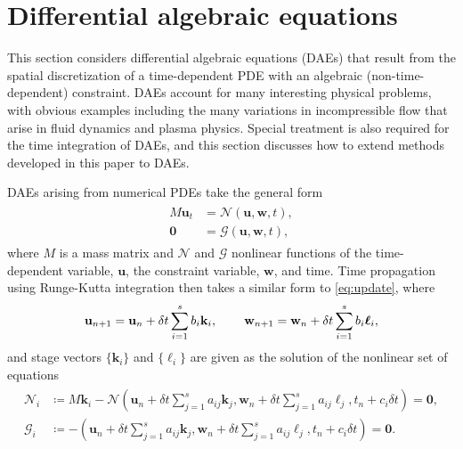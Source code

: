\documentclass[review]{siamart}
\begin{document}
\section{Differential algebraic equations}\label{sec:dae}

This section considers differential algebraic equations (DAEs) that result from
the spatial discretization of a time-dependent PDE with an algebraic
(non-time-dependent) constraint. DAEs account for many interesting physical
problems, with obvious examples including the many variations in incompressible
flow that arise in fluid dynamics and plasma physics. Special treatment is also
required for the time integration of DAEs, and this section discusses how to
extend methods developed in this paper to DAEs.

DAEs arising from numerical PDEs take the general form
%
\begin{align}\label{eq:dae}
\begin{split}
M\mathbf{u}_t & = \mathcal{N}(\mathbf{u},\mathbf{w},t), \\
\mathbf{0} & = \mathcal{G}(\mathbf{u},\mathbf{w},t),
\end{split}
\end{align}
%
where $M$ is a mass matrix and $\mathcal{N}$ and $\mathcal{G}$ nonlinear
functions of the time-dependent variable, $\mathbf{u}$, the constraint
variable, $\mathbf{w}$, and time.
Time propagation using Runge-Kutta integration then takes a similar form to
\eqref{eq:update}, where
%
\begin{align*}
\mathbf{u}_{n+1} = \mathbf{u}_n + \delta t\sum_{i=1}^s b_i\mathbf{k}_i, \hspace{5ex}
\mathbf{w}_{n+1} = \mathbf{w}_n + \delta t\sum_{i=1}^s b_i\boldsymbol{\ell}_i,
\end{align*}
%
and stage vectors $\{\mathbf{k}_i\}$ and $\{\boldsymbol{\ell}_i\}$ are
given as the solution of the nonlinear set of equations
\cite[Ch. 4]{brenan1995numerical}
%
\begin{align}\label{eq:dae_stage}
\begin{split}
\mathcal{N}_i &\coloneqq M\mathbf{k}_i -
	\mathcal{N} \left (\mathbf{u}_{n} + \delta t\sum_{j=1}^s a_{ij}\mathbf{k}_j,
	\mathbf{w}_{n} + \delta t\sum_{j=1}^s a_{ij}\boldsymbol{\ell}_j, t_{n} + c_i\delta t\right)
	= \mathbf{0}, \\
\mathcal{G}_i &\coloneqq - \left (\mathbf{u}_{n} + \delta t\sum_{j=1}^s a_{ij}\mathbf{k}_j,
	\mathbf{w}_{n} + \delta t\sum_{j=1}^s a_{ij}\boldsymbol{\ell}_j, t_{n} + c_i\delta t\right)
	= \mathbf{0}.
\end{split}
\end{align}
%
\end{document}
